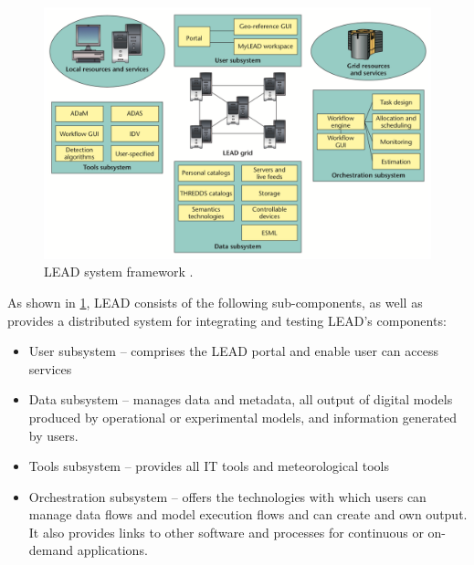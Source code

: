 \begin{figure}[htp]
    \centering
    \includegraphics[width=1.0\textwidth]{lit/lead/LEAD-system-framework-LEAD-is-composed-of-several-interacting-subsystems-with-the-LEAD_W640.png}
    \caption[LEAD system framework]{LEAD system framework \cite{Droegemeier2005Service-OrientedWeather}.}
    \label{fi:lead_framework}
\end{figure}

As shown in \cref{fi:lead_framework}, LEAD consists of the following sub-components, as well as provides a distributed system for integrating and testing LEAD's components:
\begin{itemize}
    \item User subsystem – comprises the LEAD portal and enable user can access services
    \item Data subsystem – manages data and metadata, all output of digital models produced by operational or experimental models, and information generated by users.
    \item Tools subsystem – provides all IT tools and meteorological tools
    \item Orchestration subsystem – offers the technologies with which users can manage data flows and model execution flows and can create and own output. It also provides links to other software and processes for continuous or on-demand applications.
\end{itemize}

